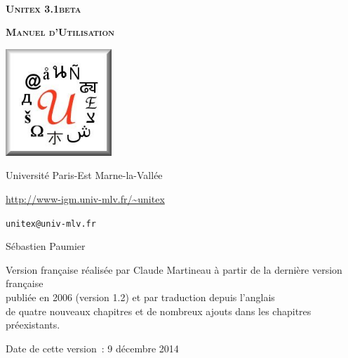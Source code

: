 
\begin{titlepage}
\begin{center}

~

\vspace{3cm}
\Huge
\textsc{\textbf{Unitex 3.1beta}}

\vspace{1cm}

\huge
\textsc{\textbf{Manuel d'Utilisation}}

\vspace{2cm}

  \begin{center}
    \includegraphics[width=4cm]{resources/img/logo-Unitex.png}
  \end{center}
\normalsize

\vspace{2cm}

\LARGE

Université Paris-Est Marne-la-Vallée
\bigskip
\normalsize

\url{http://www-igm.univ-mlv.fr/~unitex}

\verb$unitex@univ-mlv.fr$

\vspace{1cm}

Sébastien Paumier
\bigskip

Version française réalisée par Claude Martineau à partir de la dernière version française\\
publiée en 2006 (version 1.2) et par traduction depuis l'anglais\\
de quatre nouveaux chapitres et de nombreux ajouts dans les chapitres préexistants.
\bigskip

Date de cette version~: 9 décembre 2014

\end{center}

\end{titlepage}
